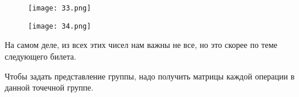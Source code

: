 		\begin{figure}[H]
		\centering
		{\texttt{[image: 33.png]}}
	\end{figure}
	
		\begin{figure}[H]
		\centering
		{\texttt{[image: 34.png]}}
	\end{figure}
	
	
	На самом деле, из всех этих чисел нам важны не все, но это скорее по
	теме следующего билета.
	
	\par\smallskip
	
	Чтобы задать представление группы, надо получить матрицы каждой
	операции в данной точечной группе.
	
	\par\bigskip
	\par\bigskip
	